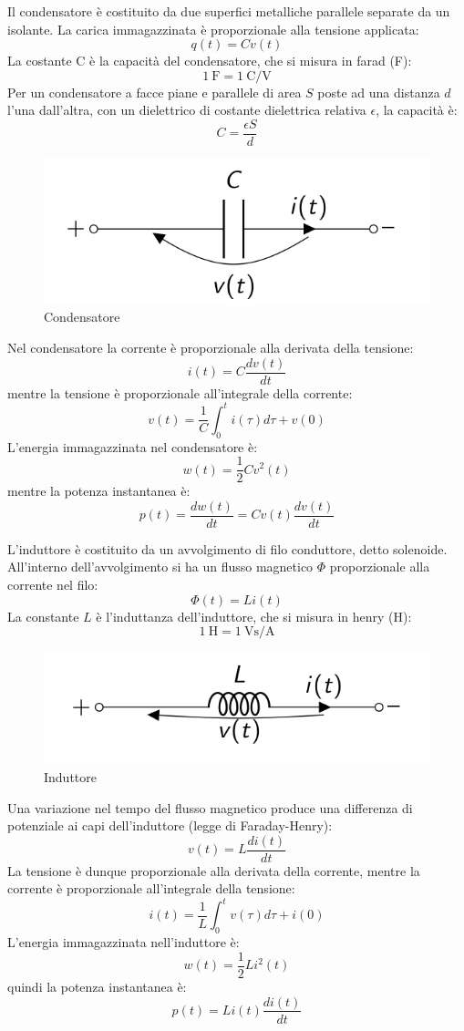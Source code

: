 \begin{defn}[Condensatore]
    Il condensatore è costituito da due superfici metalliche parallele separate da un isolante. 
    La carica immagazzinata è proporzionale alla tensione applicata: $$q(t) = C v(t)$$
    La costante C è la capacità del condensatore, che si misura in farad (F): $$\SI{1}{\farad} = \SI{1}{\coulomb\per\volt}$$
    Per un condensatore a facce piane e parallele di area $S$ poste ad una distanza $d$ l'una dall'altra, 
    con un dielettrico di costante dielettrica relativa $\epsilon$, la capacità è: $$C = \frac{\epsilon S}{d}$$
	\begin{figure}[H]
		\centering
		\includegraphics[width=0.5\linewidth]{figures/condensatore.png}
		\caption{Condensatore}
		\label{fig:condensatore}
	\end{figure}
    \noindent Nel condensatore la corrente è proporzionale alla derivata della tensione: $$i(t) = C \frac{dv(t)}{dt}$$
    mentre la tensione è proporzionale all'integrale della corrente: $$v(t) = \frac{1}{C} \int_{0}^{t} i(\tau) d\tau + v(0)$$
    L'energia immagazzinata nel condensatore è: $$w(t) = \frac{1}{2} C v^2(t)$$
    mentre la potenza instantanea è: $$p(t) = \frac{dw(t)}{dt} = C v(t) \frac{dv(t)}{dt}$$
\end{defn}

\begin{defn}
    L'induttore è costituito da un avvolgimento di filo conduttore, detto solenoide.
    All'interno dell'avvolgimento si ha un flusso magnetico $\Phi$ proporzionale alla corrente nel filo: $$\Phi(t) = L i(t)$$
    La constante $L$ è l'induttanza dell'induttore, che si misura in henry (H): $$\SI{1}{\henry} = \SI{1}{\volt\second\per\ampere}$$
	\begin{figure}[H]
		\centering
		\includegraphics[width=0.5\linewidth]{figures/induttore.png}
		\caption{Induttore}
		\label{fig:induttore}
	\end{figure}
    \noindent Una variazione nel tempo del flusso magnetico produce una differenza di potenziale ai capi dell'induttore (legge di Faraday-Henry):
    $$v(t) = L \frac{di(t)}{dt}$$
    La tensione è dunque proporzionale alla derivata della corrente, mentre la corrente è proporzionale all'integrale della tensione:
    $$i(t) = \frac{1}{L} \int_{0}^{t} v(\tau) d\tau + i(0)$$
    L'energia immagazzinata nell'induttore è: $$w(t) = \frac{1}{2} L i^2(t)$$
    quindi la potenza instantanea è: $$p(t) = L i(t) \frac{di(t)}{dt}$$
\end{defn}

